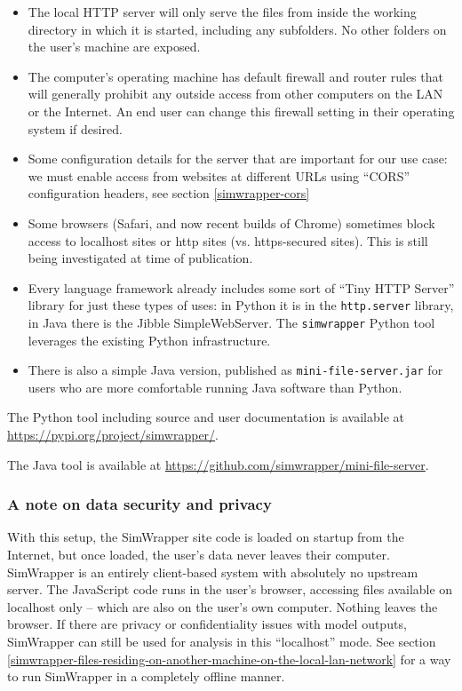 \begin{itemize}
\item
  The local HTTP server will only serve the files from inside the
  working directory in which it is started, including any subfolders. No
  other folders on the user's machine are exposed.
\item
  The computer's operating machine has default firewall and router rules
  that will generally prohibit any outside access from other computers
  on the LAN or the Internet. An end user can change this firewall setting
  in their operating system if desired.
\item
  Some configuration details for the server that are important for our
  use case: we must enable access from websites at different URLs using
  ``\gls{CORS}'' configuration headers, see section \ref{simwrapper-cors}
\item
  Some browsers (Safari, and now recent builds of Chrome) sometimes
  block access to localhost sites or http sites (vs. https-secured sites).
  This is still being investigated at time of publication.
\item
  Every language framework already includes some sort of ``Tiny HTTP
  Server'' library for just these types of uses: in Python it is in the
  \texttt{http.server} library, in Java there is the Jibble
  SimpleWebServer. The \texttt{simwrapper} Python tool leverages the
  existing Python infrastructure.
\item
  There is also a simple Java version, published as
  \texttt{mini-file-server.jar} for users who are more comfortable
  running Java software than Python.
\end{itemize}

The Python tool including source and user documentation is available at \url{https://pypi.org/project/simwrapper/}.

The Java tool is available at \url{https://github.com/simwrapper/mini-file-server}.


\hypertarget{simwrapper-data-security-and-privacy}{%
\subsubsection{A note on data security and privacy}\label{simwrapper-data-security-and-privacy}}

With this setup, the SimWrapper site code is loaded on startup from the Internet, but once loaded, the user's data never leaves their computer. SimWrapper is an entirely client-based system with absolutely no upstream server. The JavaScript code runs in the user's browser, accessing files available on localhost only -- which are also on the user's own computer. Nothing leaves the browser. If there are privacy or confidentiality issues with model outputs, SimWrapper can still be used for analysis in this ``localhost'' mode. See section \ref{simwrapper-files-residing-on-another-machine-on-the-local-lan-network} for a way to run SimWrapper in a completely offline manner.

